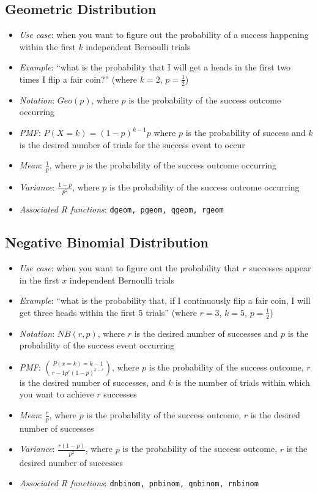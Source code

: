 \documentclass[12pt]{article}
\begin{document}
\subsection{Geometric Distribution}
\begin{itemize}
	\item \textit{Use case}: when you want to figure out the probability of a
	      success happening within the first $k$ independent Bernoulli trials
	\item \textit{Example}: ``what is the probability that I will get a heads
	      in the first two times I flip a fair coin?'' (where $k = 2$, $p = \frac{1}{2}$)
	\item \textit{Notation}: $Geo(p)$, where $p$ is the probability of the
	      success outcome occurring
	\item \textit{PMF}: $P(X = k) = (1-p)^{k-1}p$ where $p$ is the
	      probability of success and $k$ is the desired number of trials for the success event to occur
	\item \textit{Mean}: $\frac{1}{p}$, where $p$ is the probability of the success outcome occurring
	\item \textit{Variance}: $\frac{1-p}{p^2}$, where $p$ is the probability of the success outcome occurring
	\item \textit{Associated R functions}: \verb|dgeom, pgeom, qgeom, rgeom|
\end{itemize}
\subsection{Negative Binomial Distribution}
\begin{itemize}
	\item \textit{Use case}: when you want to figure out the probability that
	      $r$ successes appear in the first $x$ independent Bernoulli trials
	\item \textit{Example}: ``what is the probability that, if I continuously
	      flip a fair coin, I will get three heads within the first 5 trials'' (where
	      $r = 3$, $k = 5$, $p = \frac{1}{2}$)
	\item \textit{Notation}: $NB(r,p)$, where $r$ is the
	      desired number of successes and $p$ is the
	      probability of the success event occurring
	\item \textit{PMF}: $P(x = k) = {k - 1}\choose{r - 1}p^r (1-p)^{k-r}$, where $p$ is the
	      probability of the success outcome, $r$ is the desired number of
	      successes, and $k$ is the number of trials within which you want to
	      achieve $r$ successes
	\item \textit{Mean}: $\frac{r}{p}$, where $p$ is the probability of
	      the success outcome, $r$ is the desired number of successes
	\item \textit{Variance}: $\frac{r(1-p)}{p^2}$, where $p$ is the probability of
	      the success outcome, $r$ is the desired number of successes
	\item \textit{Associated R functions}: \verb|dnbinom, pnbinom, qnbinom, rnbinom|
\end{itemize}
\end{document}
